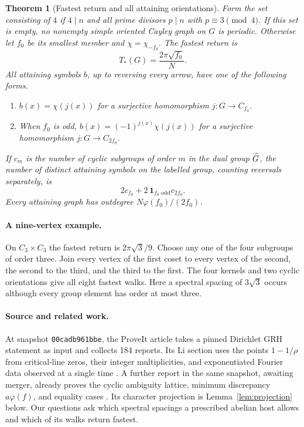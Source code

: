 \documentclass[11pt]{article}
\newtheorem{theorem}{Theorem}[section]
\begin{document}
\begin{theorem}[Fastest return and all attaining orientations]\label{thm:fast}
Form the set consisting of $4$ if $4\mid n$ and all prime divisors $p\mid n$ with $p\equiv3\pmod4$. If this set is empty, no nonempty simple oriented Cayley graph on $G$ is periodic. Otherwise let $f_0$ be its smallest member and $\chi=\chi_{-f_0}$. The fastest return is
\[
                T_*(G)=\frac{2\pi\sqrt{f_0}}{N}.
\]
All attaining symbols $b$, up to reversing every arrow, have one of the following forms.
\begin{enumerate}[label=\textup{(\roman*)},itemsep=1pt]
\item $b(x)=\chi(j(x))$ for a surjective homomorphism $j:G\to C_{f_0}$.
\item When $f_0$ is odd, $b(x)=(-1)^{j(x)}\chi(j(x))$ for a surjective homomorphism $j:G\to C_{2f_0}$.
\end{enumerate}
If $c_m$ is the number of cyclic subgroups of order $m$ in the dual group $\widehat G$, the number of distinct attaining symbols on the labelled group, counting reversals separately, is
\[
             2c_{f_0}+2\,\mathbf{1}_{f_0\text{ odd}}c_{2f_0}.
\]
Every attaining graph has outdegree $N\varphi(f_0)/(2f_0)$.
\end{theorem}

\paragraph{A nine-vertex example.} On $C_3\times C_3$ the fastest return is $2\pi\sqrt3/9$. Choose any one of the four subgroups of order three. Join every vertex of the first coset to every vertex of the second, the second to the third, and the third to the first. The four kernels and two cyclic orientations give all eight fastest walks. Here a spectral spacing of $3\sqrt3$ occurs although every group element has order at most three.

\paragraph{Source and related work.} At snapshot \texttt{00cadb961bbe}, the ProveIt article takes a pinned Dirichlet GRH statement as input and collects 184 reports. Its Li section uses the points $1-1/\rho$ from critical-line zeros, their integer multiplicities, and exponentiated Fourier data observed at a single time \cite{project}. A further report in the same snapshot, awaiting merger, already proves the cyclic ambiguity lattice, minimum discrepancy $a\varphi(f)$, and equality cases \cite{heat}. Its character projection is Lemma~\ref{lem:projection} below. Our questions ask which spectral spacings a prescribed abelian host allows and which of its walks return fastest.
\end{document}
